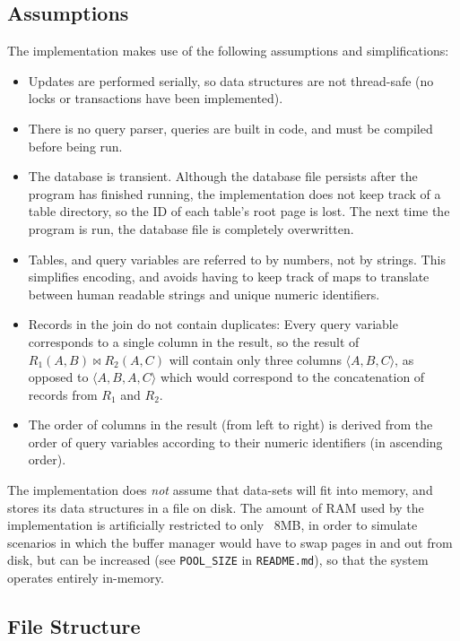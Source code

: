 \subsection{Assumptions}\label{sec:q-2-ass}

The implementation makes use of the following assumptions and simplifications:

\begin{itemize}
  \item Updates are performed serially, so data structures are not thread-safe (no locks or transactions have been implemented).
  \item There is no query parser, queries are built in code, and must be compiled before being run.
  \item The database is transient. Although the database file persists after the program has finished running, the implementation does not keep track of a table directory, so the ID of each table's root page is lost. The next time the program is run, the database file is completely overwritten.
  \item Tables, and query variables are referred to by numbers, not by strings. This simplifies encoding, and avoids having to keep track of maps to translate between human readable strings and unique numeric identifiers.
  \item Records in the join do not contain duplicates: Every query variable corresponds to a single column in the result, so the result of $R_1(A,B)\bowtie R_2(A,C)$ will contain only three columns $\langle A, B, C\rangle$, as opposed to $\langle A, B, A, C\rangle$ which would correspond to the concatenation of records from $R_1$ and $R_2$.
  \item The order of columns in the result (from left to right) is derived from the order of query variables according to their numeric identifiers (in ascending order).
\end{itemize}

The implementation does \textit{not} assume that data-sets will fit into memory, and stores its data structures in a file on disk. The amount of RAM used by the implementation is artificially restricted to only ~8MB, in order to simulate scenarios in which the buffer manager would have to swap pages in and out from disk, but can be increased (see \texttt{POOL\_SIZE} in \texttt{README.md}), so that the system operates entirely in-memory.

\subsection{File Structure}\label{sec:q-2-struct}

